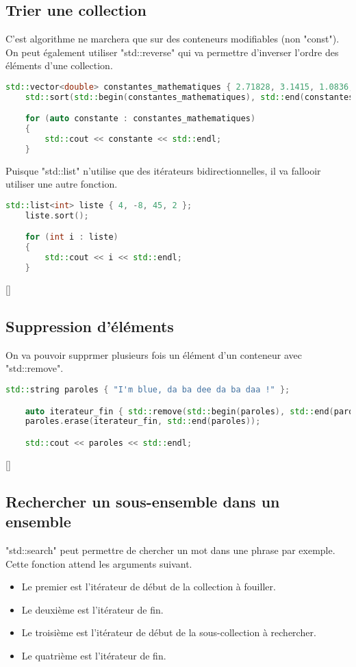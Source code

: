 \documentclass{article}
\begin{document}
\subsection{Trier une collection}
C'est algorithme ne marchera que sur des conteneurs modifiables (non "const"). On peut également utiliser "std::reverse" qui va permettre d'inverser l'ordre des éléments d'une collection.
\begin{lstlisting}[language=C++]
    std::vector<double> constantes_mathematiques { 2.71828, 3.1415, 1.0836, 1.4142, 1.6180 };
    std::sort(std::begin(constantes_mathematiques), std::end(constantes_mathematiques));

    for (auto constante : constantes_mathematiques)
    {
        std::cout << constante << std::endl;
    }
\end{lstlisting}
Puisque "std::list" n'utilise que des itérateurs bidirectionnelles, il va fallooir utiliser une autre fonction.

\begin{lstlisting}[language=C++]
    std::list<int> liste { 4, -8, 45, 2 };
    liste.sort();

    for (int i : liste)
    {
        std::cout << i << std::endl;
    }
\end{lstlisting}[]

\subsection{Suppression d'éléments}
On va pouvoir supprmer plusieurs fois un élément d'un conteneur avec "std::remove".

\begin{lstlisting}[language=C++]
    std::string paroles { "I'm blue, da ba dee da ba daa !" };

    auto iterateur_fin { std::remove(std::begin(paroles), std::end(paroles), 'b') };
    paroles.erase(iterateur_fin, std::end(paroles));

    std::cout << paroles << std::endl;
\end{lstlisting}[]

\subsection{Rechercher un sous-ensemble dans un ensemble}
"std::search" peut permettre de chercher un mot dans une phrase par exemple. Cette fonction attend les arguments suivant.

\begin{itemize}
    \item Le premier est l’itérateur de début de la collection à fouiller.
    \item Le deuxième est l’itérateur de fin.
    \item Le troisième est l’itérateur de début de la sous-collection à rechercher.
    \item Le quatrième est l’itérateur de fin.
\end{itemize}{}
\end{document}
